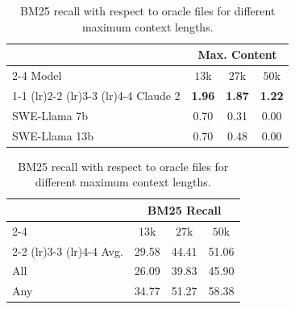 \begin{table}[ht]
\centering
\begin{minipage}[t]{0.48\textwidth}
    \centering
    \caption{
    Model resolve rates with BM25 retrieval, with different maximum context lengths.
    }
    \begin{tabular}{lccc}
        \toprule
         & \multicolumn{3}{c}{Max. Content} \\ \cmidrule(lr){2-4} 
        Model & $13$k & $27$k & $50$k \\    \cmidrule(lr){1-1}  \cmidrule(lr){2-2} \cmidrule(lr){3-3} \cmidrule(lr){4-4}  
        Claude 2        & {\bf 1.96} & {\bf 1.87} & {\bf 1.22} \\
        SWE-Llama 7b    & 0.70 & 0.31 & 0.00 \\
        SWE-Llama 13b   & 0.70 & 0.48 & 0.00 \\
        \bottomrule
    \end{tabular}
    \label{table:bm25-results}
\end{minipage}
\hfill
\begin{minipage}[t]{0.48\textwidth}
    \centering
    \caption{
    BM25 recall with respect to  oracle files for different maximum context lengths.
    }
    \begin{tabular}{lccc}
        \toprule
        & \multicolumn{3}{c}{BM25 Recall} \\\cmidrule(lr){2-4}
        & $13$k & $27$k & $50$k \\  \cmidrule(lr){2-2} \cmidrule(lr){3-3} \cmidrule(lr){4-4} 
        Avg.& 29.58 & 44.41 & 51.06 \\
        All & 26.09 & 39.83 & 45.90 \\
        Any & 34.77 & 51.27 & 58.38 \\
        \bottomrule
    \end{tabular}
    \label{table:recall}
\end{minipage}
\end{table}